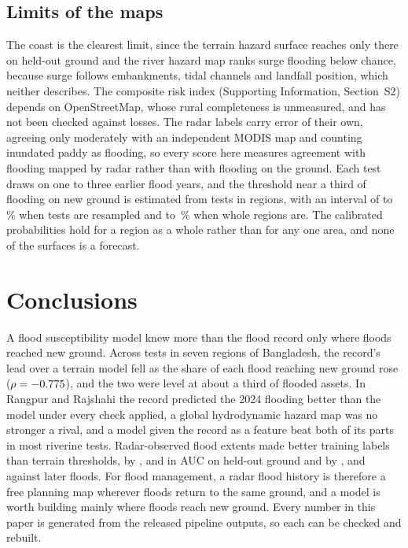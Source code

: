 \documentclass[10pt,a4paper,twocolumn]{article}
\begin{document}
\subsection{Limits of the maps}

The coast is the clearest limit, since the terrain hazard surface reaches only \CoastalHazardHeldoutAUC{} there on held-out ground and the river hazard map ranks surge flooding below chance, because surge follows embankments, tidal channels and landfall position, which neither describes. The composite risk index (Supporting Information, Section~S2) depends on OpenStreetMap, whose rural completeness is unmeasured, and has not been checked against losses. The radar labels carry error of their own, agreeing only moderately with an independent MODIS map and counting inundated paddy as flooding, so every score here measures agreement with flooding mapped by radar rather than with flooding on the ground. Each test draws on one to three earlier flood years, and the threshold near a third of flooding on new ground is estimated from \PoolTests{} tests in \PoolRegions{} regions, with an interval of \PoolCrossingLow{} to \PoolCrossingHigh{}\,\% when tests are resampled and \RegionBootCrossingLow{} to \RegionBootCrossingHigh{}\,\% when whole regions are. The calibrated probabilities hold for a region as a whole rather than for any one area, and none of the surfaces is a forecast.

\section{Conclusions}
\label{sec:conclusions}

A flood susceptibility model knew more than the flood record only where floods reached new ground. Across \PoolTests{} tests in seven regions of Bangladesh, the record's lead over a terrain model fell as the share of each flood reaching new ground rose ($\rho=-0.775{}$), and the two were level at about a third of flooded assets. In Rangpur and Rajshahi the record predicted the 2024 flooding better than the model under every check applied, a global hydrodynamic hazard map was no stronger a rival, and a model given the record as a feature beat both of its parts in most riverine tests. Radar-observed flood extents made better training labels than terrain thresholds, by \RRLabelGap{}, \SylhetLabelGap{} and \CoastalLabelGap{} in AUC on held-out ground and by \RRTempProxyGap{}, \SylhetTempProxyGap{} and \CoastalTempProxyGap{} against later floods. For flood management, a radar flood history is therefore a free planning map wherever floods return to the same ground, and a model is worth building mainly where floods reach new ground. Every number in this paper is generated from the released pipeline outputs, so each can be checked and rebuilt.
\end{document}
